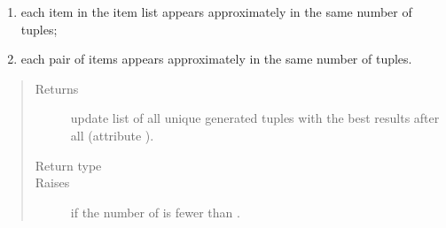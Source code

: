 \documentclass[a4paper,12pt,english]{sphinxmanual}
\begin{document}
\begin{fulllineitems}
\begin{fulllineitems}
\begin{enumerate}
\item {} 
each item in the item list appears approximately in the same number of tuples;

\item {} 
each pair of items appears approximately in the same number of tuples.

\end{enumerate}
\begin{quote}\begin{description}
\item[{Returns}] \leavevmode
update list of all unique generated tuples with the best results
after all (attribute {\hyperref[\detokenize{project_rst/generator:project.generator.DataGenerator.tuples}]{}}).

\item[{Return type}] \leavevmode
{}

\item[{Raises}] \leavevmode
{} \textendash{} if the number of {\hyperref[\detokenize{project_rst/generator:project.generator.DataGenerator.items}]{}} is fewer than {\hyperref[\detokenize{project_rst/generator:project.generator.DataGenerator.tuple_size}]{}}.

\end{description}\end{quote}

\end{fulllineitems}


\end{fulllineitems}

\end{document}
